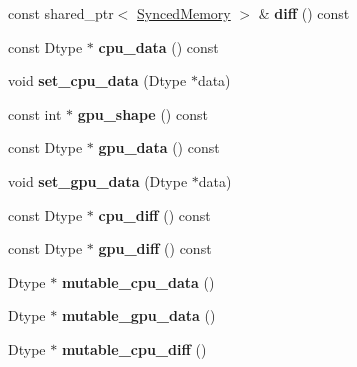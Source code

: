 \begin{DoxyCompactItemize}
\mbox{\label{classcaffe_1_1_blob_a5c5eced39d7bb4a41dd6f0fb1504a48e}} 
const shared\+\_\+ptr$<$ \mbox{\hyperlink{classcaffe_1_1_synced_memory}{Synced\+Memory}} $>$ \& {\bfseries diff} () const
\item 
\mbox{\label{classcaffe_1_1_blob_ae59d21bee3ceb872e234d1d16e4c53da}} 
const Dtype $\ast$ {\bfseries cpu\+\_\+data} () const
\item 
\mbox{\label{classcaffe_1_1_blob_a5d7d38b157e43ff6a8b8bf94b6815daf}} 
void {\bfseries set\+\_\+cpu\+\_\+data} (Dtype $\ast$data)
\item 
\mbox{\label{classcaffe_1_1_blob_a290c925be0e3a628f078a63fb788655a}} 
const int $\ast$ {\bfseries gpu\+\_\+shape} () const
\item 
\mbox{\label{classcaffe_1_1_blob_a1d78df024f82fd1ac73e92776cbcabcd}} 
const Dtype $\ast$ {\bfseries gpu\+\_\+data} () const
\item 
\mbox{\label{classcaffe_1_1_blob_ad350de479e172e963f02e8332c800bb7}} 
void {\bfseries set\+\_\+gpu\+\_\+data} (Dtype $\ast$data)
\item 
\mbox{\label{classcaffe_1_1_blob_a1a155ba90da158c9f5a8c08c0db89cfc}} 
const Dtype $\ast$ {\bfseries cpu\+\_\+diff} () const
\item 
\mbox{\label{classcaffe_1_1_blob_a594ec73321346ae563b1f90413b08563}} 
const Dtype $\ast$ {\bfseries gpu\+\_\+diff} () const
\item 
\mbox{\label{classcaffe_1_1_blob_a1570a6887d5819b9d96ad8370f051130}} 
Dtype $\ast$ {\bfseries mutable\+\_\+cpu\+\_\+data} ()
\item 
\mbox{\label{classcaffe_1_1_blob_a379a6baaaece8a322b49b393171dfb91}} 
Dtype $\ast$ {\bfseries mutable\+\_\+gpu\+\_\+data} ()
\item 
\mbox{\label{classcaffe_1_1_blob_aa49d91e337ca8be1f420f5f6503d5ca4}} 
Dtype $\ast$ {\bfseries mutable\+\_\+cpu\+\_\+diff} ()

\end{DoxyCompactItemize}

